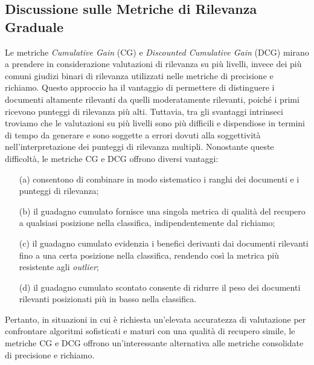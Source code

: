 \documentclass{report}
\begin{document}
	\subsection{Discussione sulle Metriche di Rilevanza Graduale}
	Le metriche \textit{Cumulative Gain} (CG) e \textit{Discounted Cumulative Gain} (DCG) mirano a prendere in considerazione valutazioni di rilevanza su più livelli, invece dei più comuni giudizi binari di rilevanza utilizzati nelle metriche di precisione e richiamo. Questo approccio ha il vantaggio di permettere di distinguere i documenti altamente rilevanti da quelli moderatamente rilevanti, poiché i primi ricevono punteggi di rilevanza più alti. Tuttavia, tra gli svantaggi intrinseci troviamo che le valutazioni su più livelli sono più difficili e dispendiose in termini di tempo da generare e sono soggette a errori dovuti alla soggettività nell'interpretazione dei punteggi di rilevanza multipli.
	Nonostante queste difficoltà, le metriche CG e DCG offrono diversi vantaggi:
	\begin{itemize}
		\item[(a)] consentono di combinare in modo sistematico i ranghi dei documenti e i punteggi di rilevanza;
		\item[(b)] il guadagno cumulato fornisce una singola metrica di qualità del recupero a qualsiasi posizione nella classifica, indipendentemente dal richiamo;
		\item[(c)] il guadagno cumulato evidenzia i benefici derivanti dai documenti rilevanti fino a una certa posizione nella classifica, rendendo così la metrica più resistente agli \textit{outlier};
		\item[(d)] il guadagno cumulato scontato consente di ridurre il peso dei documenti rilevanti posizionati più in basso nella classifica.
	\end{itemize}
	Pertanto, in situazioni in cui è richiesta un'elevata accuratezza di valutazione per confrontare algoritmi sofisticati e maturi con una qualità di recupero simile, le metriche CG e DCG offrono un'interessante alternativa alle metriche consolidate di precisione e richiamo.
\end{document}
